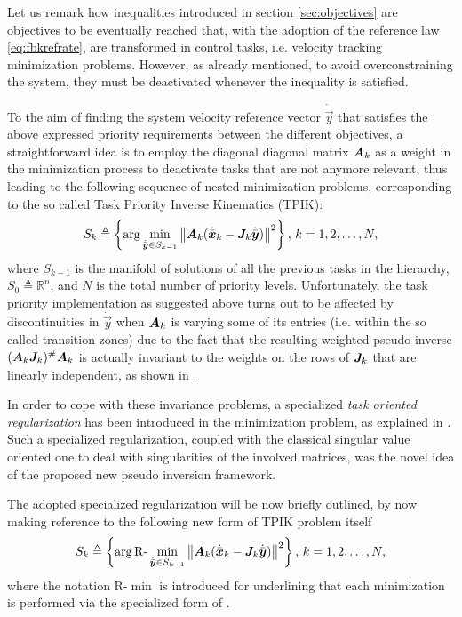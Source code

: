 Let us remark how inequalities introduced in section \ref{sec:objectives} are objectives to be eventually reached that, with the adoption of the reference law \eqref{eq:fbkrefrate}, are transformed in control tasks, i.e. velocity tracking minimization problems. However, as already mentioned, to avoid overconstraining the system, they must be deactivated whenever the inequality is satisfied.

To the aim of finding the system velocity reference vector $\dot{\bar{\vec{y}}}$ that satisfies the above expressed priority requirements between the different objectives, a straightforward idea is to employ the diagonal diagonal matrix $\bm{A}_k$ as a weight in the minimization process to deactivate tasks that are not anymore relevant, thus leading to the following sequence of nested minimization problems, corresponding to the so called Task Priority Inverse Kinematics (TPIK):
\begin{equation}\label{eq_original_problem}
S_k \triangleq \left\{ \arg \min_{\dot{\bar{\bm{y}}} \in S_{k-1}} \left\| \bm{A}_k (\dot{\bar{\bm{x}}}_k - \bm{J}_k \dot{\bar{\bm{y}}}) \right\|^2 \right\},\, k = 1, 2, \ldots, N,
\end{equation}
where $S_{k-1}$ is the manifold of solutions of all the previous tasks in the hierarchy, $S_0 \triangleq \mathbb{R}^n$, and $N$ is the total number of priority levels. Unfortunately, the task priority implementation as suggested above turns out to be affected by discontinuities in $\dot{\vec{y}}$ when $\bm{A}_k$ is varying some of its entries (i.e. within the so called transition zones) due to the fact that the resulting weighted pseudo-inverse $(\bm{A}_k\bm{J}_k)^\# \bm{A}_k$ is actually invariant to the weights on the rows of $\bm{J}_k$ that are linearly independent, as shown in \cite{Doty1993}.

In order to cope with these invariance problems, a specialized \emph{task oriented regularization} has been introduced in the minimization problem, as explained in \cite{Simetti2016d}. Such a specialized regularization, coupled with the classical singular value oriented one to deal with singularities of the involved matrices, was the novel idea of the proposed new pseudo inversion framework.

The adopted specialized regularization will be now briefly outlined, by now making reference to the following new form of TPIK problem itself   
\begin{equation}\label{eq_rminproblem}
S_k \triangleq \left\{ \arg \mathrm{R\textrm{-}}\min_{\dot{\bar{\bm{y}}} \in S_{k-1}} \left\| \bm{A}_k (\dot{\bar{\bm{x}}}_k - \bm{J}_k \dot{\bar{\bm{y}}}) \right\|^2 \right\},\, k = 1, 2, \ldots, N,
\end{equation}
where the notation $\mathrm{R\textrm{-}}\min$ is introduced for underlining that each minimization is performed via the specialized form of \cite{Simetti2016d}.

